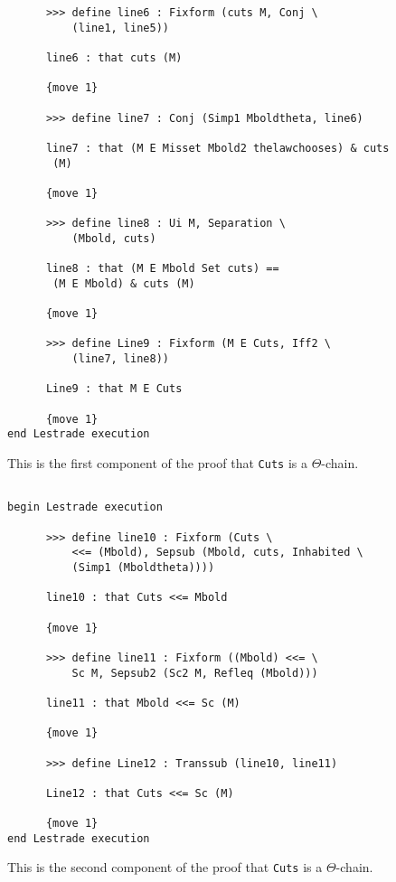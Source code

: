 \documentclass[12pt]{article}
\begin{document}
\begin{verbatim}
      >>> define line6 : Fixform (cuts M, Conj \
          (line1, line5))

      line6 : that cuts (M)

      {move 1}

      >>> define line7 : Conj (Simp1 Mboldtheta, line6)

      line7 : that (M E Misset Mbold2 thelawchooses) & cuts 
       (M)

      {move 1}

      >>> define line8 : Ui M, Separation \
          (Mbold, cuts)

      line8 : that (M E Mbold Set cuts) == 
       (M E Mbold) & cuts (M)

      {move 1}

      >>> define Line9 : Fixform (M E Cuts, Iff2 \
          (line7, line8))

      Line9 : that M E Cuts

      {move 1}
end Lestrade execution
\end{verbatim}

This is the first component of the proof that {\tt Cuts} is a $\Theta$-chain.

\begin{verbatim}

begin Lestrade execution

      >>> define line10 : Fixform (Cuts \
          <<= (Mbold), Sepsub (Mbold, cuts, Inhabited \
          (Simp1 (Mboldtheta))))

      line10 : that Cuts <<= Mbold

      {move 1}

      >>> define line11 : Fixform ((Mbold) <<= \
          Sc M, Sepsub2 (Sc2 M, Refleq (Mbold)))

      line11 : that Mbold <<= Sc (M)

      {move 1}

      >>> define Line12 : Transsub (line10, line11)

      Line12 : that Cuts <<= Sc (M)

      {move 1}
end Lestrade execution
\end{verbatim}

This is the second component of the proof that {\tt Cuts} is a $\Theta$-chain.
\end{document}
